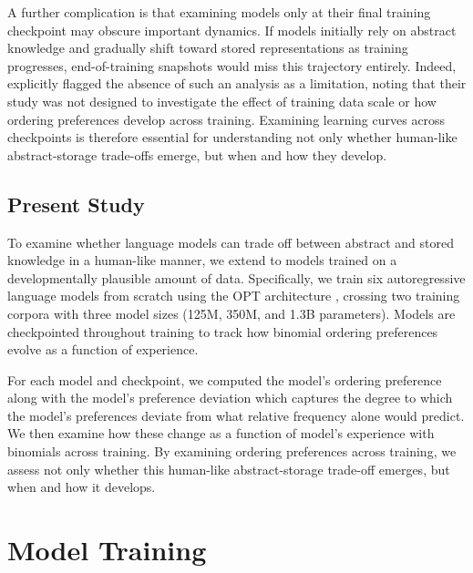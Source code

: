 \documentclass{article}
\begin{document}
A further complication is that examining models only at their final
training checkpoint may obscure important dynamics. If models initially
rely on abstract knowledge and gradually shift toward stored
representations as training progresses, end-of-training snapshots would
miss this trajectory entirely. Indeed,
\citet{houghton2025roleabstractrepresentations} explicitly flagged the
absence of such an analysis as a limitation, noting that their study was
not designed to investigate the effect of training data scale or how
ordering preferences develop across training. Examining learning curves
across checkpoints is therefore essential for understanding not only
whether human-like abstract-storage trade-offs emerge, but when and how
they develop.

\subsection{Present Study}\label{present-study}

To examine whether language models can trade off between abstract and
stored knowledge in a human-like manner, we extend
\citet{houghton2025roleabstractrepresentations} to models trained on a
developmentally plausible amount of data. Specifically, we train six
autoregressive language models from scratch using the OPT architecture
\citep{zhangOPTOpenPretrained2022}, crossing two training corpora
\citetext{\citealp[BabyLM,][]{charpentier2025babylmturns3}; \citealp[and
a subset of C4,][]{raffelExploringLimitsTransfer2020}} with three model
sizes (125M, 350M, and 1.3B parameters). Models are checkpointed
throughout training to track how binomial ordering preferences evolve as
a function of experience.

For each model and checkpoint, we computed the model's ordering
preference along with the model's preference deviation which captures
the degree to which the model's preferences deviate from what relative
frequency alone would predict. We then examine how these change as a
function of model's experience with binomials across training. By
examining ordering preferences across training, we assess not only
whether this human-like abstract-storage trade-off emerges, but when and
how it develops.

\section{Model Training}\label{model-training}
\end{document}
